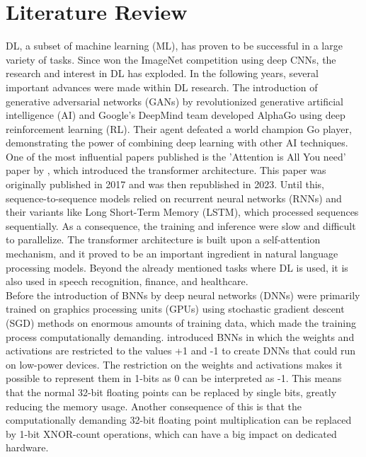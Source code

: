 \section{Literature Review}

DL, a subset of machine learning (ML), has proven to be successful in a large variety of tasks. Since \cite{imagenet2012} won the ImageNet competition using deep CNNs, the research and interest in DL has exploded. In the following years, several important advances were made within DL research. The introduction of generative adversarial networks (GANs) by \cite{goodfellow2014} revolutionized generative artificial intelligence (AI) and Google's DeepMind team developed AlphaGo using deep reinforcement learning (RL). Their agent defeated a world champion Go player, demonstrating the power of combining deep learning with other AI techniques. One of the most influential papers published is the 'Attention is All You need' paper by \cite{attention2017}, which introduced the transformer architecture. This paper was originally published in 2017 and was then republished in 2023. Until this, sequence-to-sequence models relied on recurrent neural networks (RNNs) and their variants like Long Short-Term Memory (LSTM), which processed sequences sequentially. As a consequence, the training and inference were slow and difficult to parallelize. The transformer architecture is built upon a self-attention mechanism, and it proved to be an important ingredient in natural language processing models. Beyond the already mentioned tasks where DL is used, it is also used in speech recognition, finance, and healthcare. \\

\noindent Before the introduction of BNNs by \cite{Hubara2016} deep neural networks (DNNs) were primarily trained on graphics processing units (GPUs) using stochastic gradient descent (SGD) methods on enormous amounts of training data, which made the training process computationally demanding. \cite{Hubara2016} introduced BNNs in which the weights and activations are restricted to the values +1 and -1 to create DNNs that could run on low-power devices. The restriction on the weights and activations makes it possible to represent them in 1-bits as 0 can be interpreted as -1. This means that the normal 32-bit floating points can be replaced by single bits, greatly reducing the memory usage. Another consequence of this is that the computationally demanding 32-bit floating point multiplication can be replaced by 1-bit XNOR-count operations, which can have a big impact on dedicated hardware. \\

